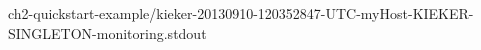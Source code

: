 \setTextListing

{ch2-quickstart-example/kieker-20130910-120352847-UTC-myHost-KIEKER-SINGLETON-monitoring.stdout}